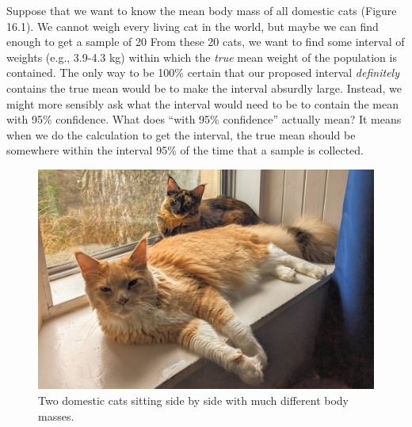 \documentclass[
]{scrbook}
\begin{document}
Suppose that we want to know the mean body mass of all domestic cats (Figure 16.1).
We cannot weigh every living cat in the world, but maybe we can find enough to get a sample of 20
From these 20 cats, we want to find some interval of weights (e.g., 3.9-4.3 kg) within which the \emph{true} mean weight of the population is contained.
The only way to be 100\% certain that our proposed interval \emph{definitely} contains the true mean would be to make the interval absurdly large.
Instead, we might more sensibly ask what the interval would need to be to contain the mean with 95\% confidence.
What does ``with 95\% confidence'' actually mean?
It means when we do the calculation to get the interval, the true mean should be somewhere within the interval 95\% of the time that a sample is collected.

\begin{figure}
\includegraphics[width=1\linewidth]{img/housecats} \caption{Two domestic cats sitting side by side with much different body masses.}\label{fig:unnamed-chunk-82}
\end{figure}
\end{document}
